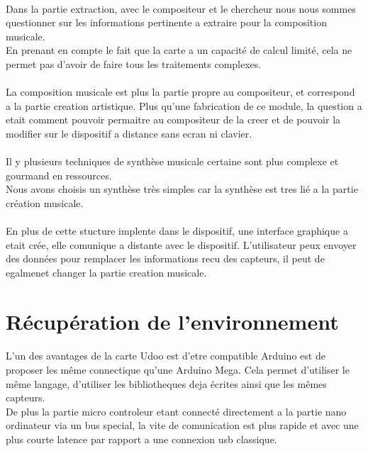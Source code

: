 \documentclass[a4paper, titlepage, oneside, 12pt]{article}%
\begin{document}
\paragraph{}
Dans la partie extraction, avec le compositeur et le chercheur nous nous sommes questionner sur les informations pertinente a extraire pour la composition musicale.\\ 
En prenant en compte le fait que la carte a un capacité de calcul limité, cela ne permet pas d'avoir de faire tous les traitements complexes.


\paragraph{}
La composition musicale est plus la partie propre au compositeur, et correspond a la partie creation artistique. Plus qu'une fabrication de ce module, la question a etait comment pouvoir permaitre au compositeur de la creer et de pouvoir la modifier sur le dispositif a distance sans ecran ni clavier.

\paragraph{}
Il y plusieurs techniques de synthèse musicale certaine sont plus complexe et gourmand en ressources.\\ Nous avons choisis un synthèse très simples car la synthèse est tres lié a la partie création musicale. 

\paragraph{}
En plus de cette stucture implente dans le dispositif, une interface graphique a etait crée, elle comunique a distante avec le dispositif. L'utilisateur peux envoyer des données pour remplacer les informations recu des capteurs, il peut de egalmenet changer la partie creation musicale.

\section{Récupération de l'environnement}
\paragraph{}
L'un des avantages de la carte Udoo est d'etre compatible Arduino est de proposer les même connectique qu'une Arduino Mega. Cela permet d'utiliser le même langage, d'utiliser les bibliotheques deja écrites ainsi que les mêmes capteurs.\\
De plus la partie  micro controleur etant connecté directement a la partie nano ordinateur via un bus special, la vite de comunication est plus rapide et avec une plus courte latence par rapport a une connexion usb classique.
\end{document}

